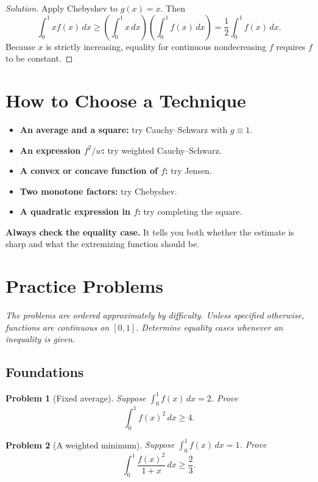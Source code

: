 \documentclass[11pt]{article}
\theoremstyle{plaincolon}
\theoremstyle{definitioncolon}
\newtheorem{problem}{Problem} %
\theoremstyle{remarkcolon}
\newenvironment{solution}{\begin{proof}[Solution]}{\end{proof}}
\numberwithin{equation}{section}
\begin{document}
\begin{solution}
Apply Chebyshev to $g(x)=x$. Then
\[
\int_0^1 xf(x)\,dx\ge
\left(\int_0^1x\,dx\right)\left(\int_0^1 f(x)\,dx\right)
=\frac12\int_0^1 f(x)\,dx.
\]
Because $x$ is strictly increasing, equality for continuous nondecreasing $f$ requires $f$ to be constant.
\end{solution}

\section{How to Choose a Technique}

\begin{mathbox}
\begin{itemize}
\item \textbf{An average and a square:} try Cauchy--Schwarz with $g\equiv1$.
\item \textbf{An expression $f^2/w$:} try weighted Cauchy--Schwarz.
\item \textbf{A convex or concave function of $f$:} try Jensen.
\item \textbf{Two monotone factors:} try Chebyshev.
\item \textbf{A quadratic expression in $f$:} try completing the square.
\end{itemize}
\textbf{Always check the equality case.} It tells you both whether the estimate is sharp and what the extremizing function should be.
\end{mathbox}

\section{Practice Problems}

\emph{The problems are ordered approximately by difficulty. Unless specified otherwise, functions are continuous on $[0,1]$. Determine equality cases whenever an inequality is given.}

\subsection{Foundations}

\begin{problem}[Fixed average]
Suppose $\int_0^1 f(x)\,dx=2$. Prove
\[
\int_0^1 f(x)^2\,dx\ge4.
\]
\end{problem}

\begin{problem}[A weighted minimum]
Suppose $\int_0^1 f(x)\,dx=1$. Prove
\[
\int_0^1\frac{f(x)^2}{1+x}\,dx\ge\frac23.
\]
\end{problem}
\end{document}
